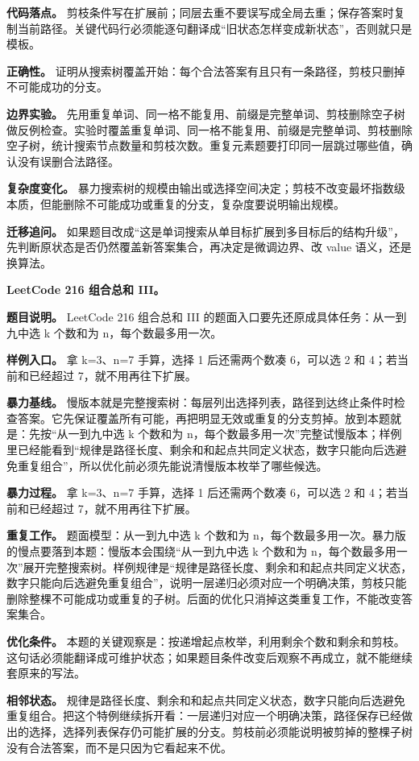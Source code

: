 \textbf{代码落点。} 剪枝条件写在扩展前；同层去重不要误写成全局去重；保存答案时复制当前路径。关键代码行必须能逐句翻译成“旧状态怎样变成新状态”，否则就只是模板。

\textbf{正确性。} 证明从搜索树覆盖开始：每个合法答案有且只有一条路径，剪枝只删掉不可能成功的分支。

\textbf{边界实验。} 先用重复单词、同一格不能复用、前缀是完整单词、剪枝删除空子树做反例检查。实验时覆盖重复单词、同一格不能复用、前缀是完整单词、剪枝删除空子树，统计搜索节点数量和剪枝次数。重复元素题要打印同一层跳过哪些值，确认没有误删合法路径。

\textbf{复杂度变化。} 暴力搜索树的规模由输出或选择空间决定；剪枝不改变最坏指数级本质，但能删除不可能成功或重复的分支，复杂度要说明输出规模。

\textbf{迁移追问。} 如果题目改成“这是单词搜索从单目标扩展到多目标后的结构升级”，先判断原状态是否仍然覆盖新答案集合，再决定是微调边界、改 value 语义，还是换算法。

\noindent\textbf{LeetCode 216 组合总和 III。}

\textbf{题目说明。} LeetCode 216 组合总和 III 的题面入口要先还原成具体任务：从一到九中选 k 个数和为 n，每个数最多用一次。

\textbf{样例入口。} 拿 k=3、n=7 手算，选择 1 后还需两个数凑 6，可以选 2 和 4；若当前和已经超过 7，就不用再往下扩展。

\textbf{暴力基线。} 慢版本就是完整搜索树：每层列出选择列表，路径到达终止条件时检查答案。它先保证覆盖所有可能，再把明显无效或重复的分支剪掉。放到本题就是：先按“从一到九中选 k 个数和为 n，每个数最多用一次”完整试慢版本；样例里已经能看到“规律是路径长度、剩余和和起点共同定义状态，数字只能向后选避免重复组合”，所以优化前必须先能说清慢版本枚举了哪些候选。

\textbf{暴力过程。} 拿 k=3、n=7 手算，选择 1 后还需两个数凑 6，可以选 2 和 4；若当前和已经超过 7，就不用再往下扩展。

\textbf{重复工作。} 题面模型：从一到九中选 k 个数和为 n，每个数最多用一次。暴力版的慢点要落到本题：慢版本会围绕“从一到九中选 k 个数和为 n，每个数最多用一次”展开完整搜索树。样例规律是“规律是路径长度、剩余和和起点共同定义状态，数字只能向后选避免重复组合”，说明一层递归必须对应一个明确决策，剪枝只能删除整棵不可能成功或重复的子树。后面的优化只消掉这类重复工作，不能改变答案集合。

\textbf{优化条件。} 本题的关键观察是：按递增起点枚举，利用剩余个数和剩余和剪枝。这句话必须能翻译成可维护状态；如果题目条件改变后观察不再成立，就不能继续套原来的写法。

\textbf{相邻状态。} 规律是路径长度、剩余和和起点共同定义状态，数字只能向后选避免重复组合。把这个特例继续拆开看：一层递归对应一个明确决策，路径保存已经做出的选择，选择列表保存仍可能扩展的分支。剪枝前必须能说明被剪掉的整棵子树没有合法答案，而不是只因为它看起来不优。

